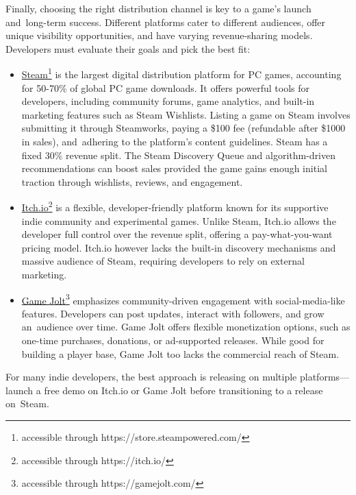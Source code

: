 Finally, choosing the right distribution channel is key to a game’s launch and~long-term success. Different platforms cater to different audiences, offer unique visibility opportunities, and have varying revenue-sharing models. Developers must evaluate their goals and pick the best fit:
\begin{itemize}
	\item \href{https://store.steampowered.com/}{Steam}\footnote{accessible through https://store.steampowered.com/} is the largest digital distribution platform for PC games, accounting for 50-70\% of global PC game downloads.\cite{zuckerman_steam-statistics} It offers powerful tools for developers, including community forums, game analytics, and built-in marketing features such as Steam Wishlists. Listing a game on Steam involves submitting it through Steamworks, paying a \$100 fee (refundable after \$1000 in sales), and~adhering to the platform’s content guidelines. Steam has a fixed 30\% revenue split. The Steam Discovery Queue and algorithm-driven recommendations can boost sales provided the game gains enough initial traction through wishlists, reviews, and engagement.\cite{steam_wishlist,steam_partner-program,steam_discovery}
	\item \href{https://itch.io/}{Itch.io}\footnote{accessible through https://itch.io/} is a flexible, developer-friendly platform known for its supportive indie community and experimental games. Unlike Steam, Itch.io allows the developer full control over the revenue split, offering a pay-what-you-want pricing model. Itch.io however lacks the built-in discovery mechanisms and massive audience of Steam, requiring developers to rely on external marketing.\cite{carpenter_creator-day}
	\item \href{https://gamejolt.com/}{Game Jolt}\footnote{accessible through https://gamejolt.com/} emphasizes community-driven engagement with social-media-like features. Developers can post updates, interact with followers, and grow an~audience over time. Game Jolt offers flexible monetization options, such as one-time purchases, donations, or ad-supported releases. While good for building a player base, Game Jolt too lacks the commercial reach of Steam.\cite{game-jolt_help}
\end{itemize}

For many indie developers, the best approach is releasing on multiple platforms---launch a free demo on Itch.io or Game Jolt before transitioning to a release on~Steam.

